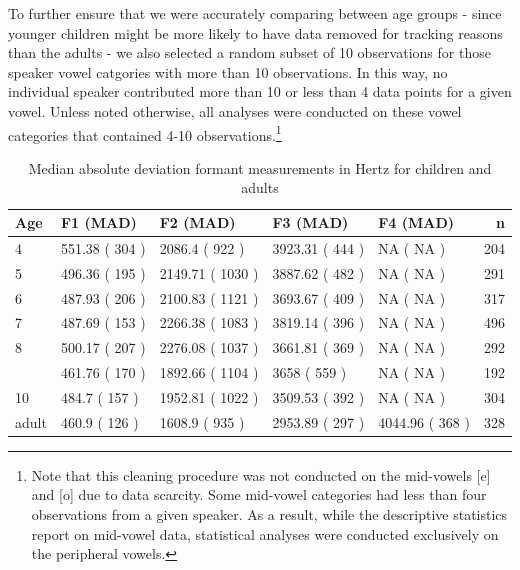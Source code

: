 \documentclass[
]{article}
\begin{document}
To further ensure that we were accurately comparing between age groups - since younger children might be more likely to have data removed for tracking reasons than the adults - we also selected a random subset of 10 observations for those speaker vowel catgories with more than 10 observations. In this way, no individual speaker contributed more than 10 or less than 4 data points for a given vowel. Unless noted otherwise, all analyses were conducted on these vowel categories that contained 4-10 observations.\footnote{Note that this cleaning procedure was not conducted on the mid-vowels {[}e{]} and {[}o{]} due to data scarcity. Some mid-vowel categories had less than four observations from a given speaker. As a result, while the descriptive statistics report on mid-vowel data, statistical analyses were conducted exclusively on the peripheral vowels.}

\begin{table}[!h]

\caption{\label{tab:summary-formant-table}Median absolute deviation formant measurements in Hertz for children and adults}
\centering
\begin{tabular}[t]{lllllr}
\toprule
Age & F1 (MAD) & F2 (MAD) & F3 (MAD) & F4 (MAD) & n\\
\midrule
4 & 551.38 ( 304 ) & 2086.4 ( 922 ) & 3923.31 ( 444 ) & NA ( NA ) & 204\\
5 & 496.36 ( 195 ) & 2149.71 ( 1030 ) & 3887.62 ( 482 ) & NA ( NA ) & 291\\
6 & 487.93 ( 206 ) & 2100.83 ( 1121 ) & 3693.67 ( 409 ) & NA ( NA ) & 317\\
7 & 487.69 ( 153 ) & 2266.38 ( 1083 ) & 3819.14 ( 396 ) & NA ( NA ) & 496\\
8 & 500.17 ( 207 ) & 2276.08 ( 1037 ) & 3661.81 ( 369 ) & NA ( NA ) & 292\\
\addlinespace
9 & 461.76 ( 170 ) & 1892.66 ( 1104 ) & 3658 ( 559 ) & NA ( NA ) & 192\\
10 & 484.7 ( 157 ) & 1952.81 ( 1022 ) & 3509.53 ( 392 ) & NA ( NA ) & 304\\
adult & 460.9 ( 126 ) & 1608.9 ( 935 ) & 2953.89 ( 297 ) & 4044.96 ( 368 ) & 328\\
\bottomrule
\end{tabular}
\end{table}
\end{document}
